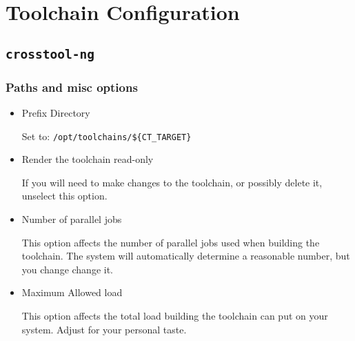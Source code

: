 %
%
%
%
\chapter{Toolchain Configuration}\label{chap:toolchain-configuration}

\section{\texttt{crosstool-ng}}

\subsection{Paths and misc options}
\begin{itemize}
\item{Prefix Directory}

  Set to: \texttt{/opt/toolchains/\$\{CT\_TARGET\}}

\item{Render the toolchain read-only}

  If you will need to make changes to the toolchain, or possibly
  delete it, unselect this option.

\item{Number of parallel jobs}

  This option affects the number of parallel jobs used when building
  the toolchain.  The system will automatically determine a reasonable
  number, but you change change it.

\item{Maximum Allowed load}

  This option affects the total load building the toolchain can put on
  your system.  Adjust for your personal taste.
\end{itemize}

